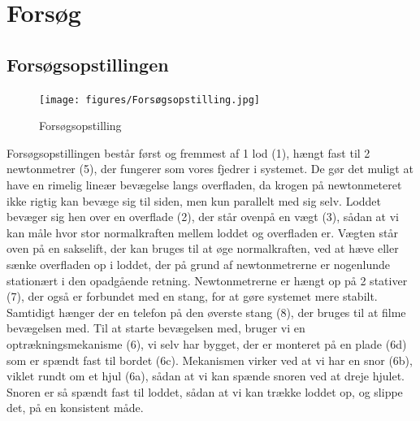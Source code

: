 \chapter{Forsøg}
\section{Forsøgsopstillingen}
\begin{figure}[htbp]
    \centering
    \texttt{[image: figures/Forsøgsopstilling.jpg]}
    \caption{Forsøgsopstilling}
    \label{fig:forsøgsopstilling}
\end{figure}
Forsøgsopstillingen består først og fremmest af 1 lod (1), hængt fast til 2 newtonmetrer (5), 
der fungerer som vores fjedrer i systemet. 
De gør det muligt at have en rimelig lineær bevægelse langs overfladen, 
da krogen på newtonmeteret ikke rigtig kan bevæge sig til siden, men kun parallelt med sig selv.
Loddet bevæger sig hen over en overflade (2), der står ovenpå en vægt (3), 
sådan at vi kan måle hvor stor normalkraften mellem loddet og overfladen er.
Vægten står oven på en sakselift, der kan bruges til at øge normalkraften, ved at hæve eller sænke overfladen op i loddet, 
der på grund af newtonmetrerne er nogenlunde stationært i den opadgående retning.
Newtonmetrerne er hængt op på 2 stativer (7), der også er forbundet med en stang, 
for at gøre systemet mere stabilt. Samtidigt hænger der en telefon på den øverste stang (8), 
der bruges til at filme bevægelsen med.
Til at starte bevægelsen med, bruger vi en optrækningsmekanisme (6), vi selv har bygget, der er monteret på en plade (6d) som er spændt fast til bordet (6c).
Mekanismen virker ved at vi har en snor (6b), viklet rundt om et hjul (6a), sådan at vi kan spænde snoren ved at dreje hjulet. 
Snoren er så spændt fast til loddet, sådan at vi kan trække loddet op, og slippe det, på en konsistent måde.
